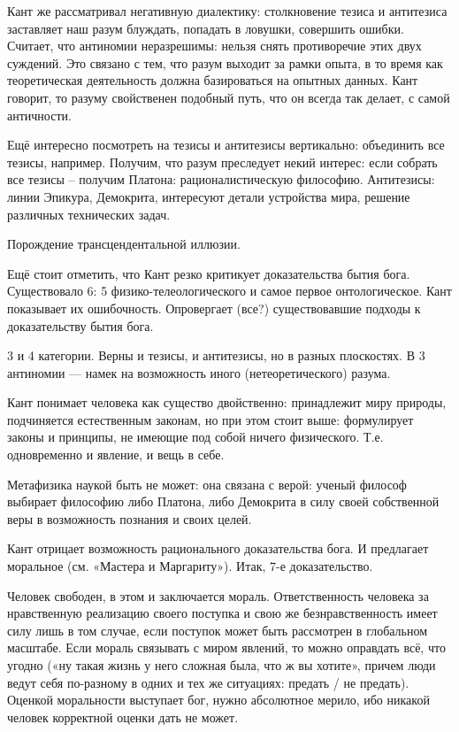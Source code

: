 Кант же рассматривал негативную диалектику: столкновение тезиса и антитезиса заставляет наш разум блуждать, попадать в ловушки, совершить ошибки. Считает, что антиномии неразрешимы: нельзя снять противоречие этих двух суждений. Это связано с тем, что разум выходит за рамки опыта, в то время как теоретическая деятельность должна базироваться на опытных данных.
Кант говорит, то разуму свойственен подобный путь, что он всегда так делает, с самой античности. 

Ещё интересно посмотреть на тезисы и антитезисы вертикально: объединить все тезисы, например. Получим, что разум преследует некий интерес: если собрать все тезисы -- получим Платона: рационалистическую философию. Антитезисы: линии Эпикура, Демокрита, интересуют детали устройства мира, решение различных технических задач.

Порождение трансцендентальной иллюзии.

Ещё стоит отметить, что Кант резко критикует доказательства бытия бога. Существовало 6: 5 физико-телеологического и самое первое онтологическое. Кант показывает их ошибочность. Опровергает (все?) существовавшие подходы к доказательству бытия бога.

3 и 4 категории. Верны и тезисы, и антитезисы, но в разных плоскостях.
В 3 антиномии --- намек на возможность иного (нетеоретического) разума.

Кант понимает человека как существо двойственно: принадлежит миру природы, подчиняется естественным законам, но при этом стоит выше: формулирует законы и принципы, не имеющие под собой ничего физического. Т.е. одновременно и явление, и вещь в себе.

Метафизика наукой быть не может: она связана с верой: ученый философ выбирает философию либо Платона, либо Демокрита в силу своей собственной веры в возможность познания и своих целей.

Кант отрицает возможность рационального доказательства бога. И предлагает моральное (см. «Мастера и Маргариту»). Итак, 7-е доказательство.

Человек свободен, в этом и заключается мораль. Ответственность человека  за нравственную реализацию своего поступка и свою же безнравственность имеет силу лишь в том случае, если поступок может быть рассмотрен в глобальном масштабе. 
Если мораль связывать с миром явлений, то можно оправдать всё, что угодно («ну такая жизнь у него сложная была, что ж вы хотите», причем люди ведут себя по-разному в одних и тех же ситуациях: предать / не предать). Оценкой моральности выступает бог, нужно абсолютное мерило, ибо никакой человек корректной оценки дать не может.

